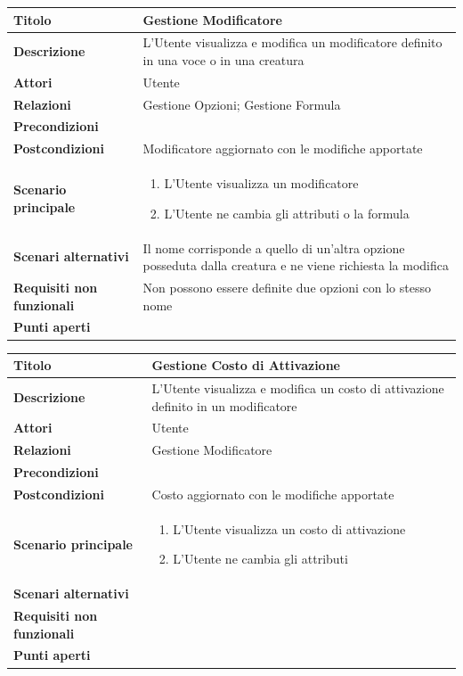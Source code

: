 \documentclass[a4paper, 11pt]{article}
\begin{document}
\begin{center}
\begin{tabular}{ |p{5cm}|p{9.5cm}|  }
\hline
\textbf{Titolo} & Gestione Modificatore \\
\hline
\textbf{Descrizione} & L'Utente visualizza e modifica un modificatore definito in una voce o in una creatura \\
\hline
\textbf{Attori} & Utente  \\
\hline
\textbf{Relazioni} & Gestione Opzioni; Gestione Formula \\
\hline
\textbf{Precondizioni} &  \\
\hline
\textbf{Postcondizioni} & Modificatore aggiornato con le modifiche apportate \\
\hline
\textbf{Scenario principale} & 
\begin{enumerate}
    \item L'Utente visualizza un modificatore
    \item L'Utente ne cambia gli attributi o la formula
\end{enumerate}
\\
\hline
\textbf{Scenari alternativi} &Il nome corrisponde a quello di un'altra opzione posseduta dalla creatura e ne viene richiesta la modifica \\
\hline
    \textbf{Requisiti non funzionali} &  Non possono essere definite due opzioni con lo stesso nome \\
\hline
\textbf{Punti aperti} &  \\
\hline
\end{tabular}

\vspace{3em}

\begin{tabular}{ |p{5cm}|p{9.5cm}|  }
\hline
\textbf{Titolo} & Gestione Costo di Attivazione \\
\hline
\textbf{Descrizione} & L'Utente visualizza e modifica un costo di attivazione definito in un modificatore \\
\hline
\textbf{Attori} & Utente  \\
\hline
\textbf{Relazioni} & Gestione Modificatore \\
\hline
\textbf{Precondizioni} &  \\
\hline
\textbf{Postcondizioni} & Costo aggiornato con le modifiche apportate \\
\hline
\textbf{Scenario principale} & 
\begin{enumerate}
    \item L'Utente visualizza un costo di attivazione
    \item L'Utente ne cambia gli attributi
\end{enumerate}
\\
\hline
\textbf{Scenari alternativi} & \\
\hline
    \textbf{Requisiti non funzionali} & \\
\hline
\textbf{Punti aperti} &  \\
\hline
\end{tabular}


\end{center}
\end{document}
